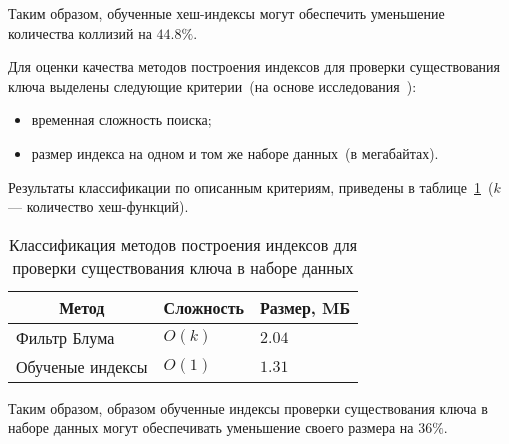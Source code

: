 Таким образом, обученные хеш-индексы могут обеспечить уменьшение количества
коллизий на $44.8\%$.

Для оценки качества методов построения индексов для проверки существования ключа
выделены следующие критерии~(на основе исследования~\cite{main}):
\begin{itemize}
    \item временная сложность поиска;
    \item размер индекса на одном и том же наборе данных~(в мегабайтах).
\end{itemize}

Результаты классификации по описанным критериям, приведены в
таблице~\ref{tab:04}~($k$ --- количество хеш-функций).

{
\captionsetup{format=hang,justification=raggedleft,
              singlelinecheck=off,width=12cm}
\begin{longtable}[Hc]{|p{5.3cm}|p{2cm}|p{2cm}|}
\caption{Классификация методов построения индексов для проверки существования
ключа в наборе данных\label{tab:04}}\\
    \hline
    \multicolumn{1}{|c|}{\textbf{Метод}} &
    \multicolumn{1}{c|}{\textbf{Сложность}} &
    \multicolumn{1}{c|}{\textbf{Размер, MБ}}\\
    \hline
    Фильтр Блума
    & $O(k)$
    & $2.04$\\
    \hline
    Обученые индексы
    & $O(1)$
    & $1.31$\\
    \hline
\end{longtable}
}

Таким образом, образом обученные индексы проверки существования ключа в наборе
данных могут обеспечивать уменьшение своего размера на $36\%$.

%
